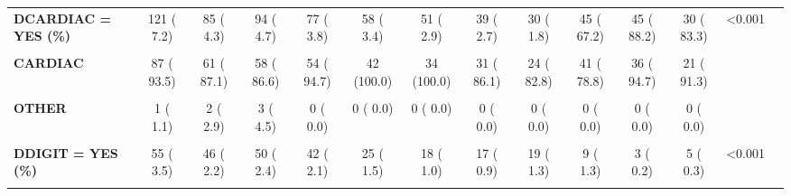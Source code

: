 \documentclass[
]{article}
\begin{document}
\begin{table}[H]
\begin{tabular}[t]{>{\raggedright\arraybackslash}p{5em}ccccccccccccc}
\textbf{DCARDIAC = YES (\%)} & 121 (  7.2) & 85 (  4.3) & 94 (  4.7) & 77 (  3.8) & 58 (  3.4) & 51 (  2.9) & 39 (  2.7) & 30 (  1.8) & 45 ( 67.2) & 45 ( 88.2) & 30 ( 83.3) & <0.001 & \\
\textbf{\cellcolor{gray!10}{DCAUSE (\%)}} & \cellcolor{gray!10}{} & \cellcolor{gray!10}{} & \cellcolor{gray!10}{} & \cellcolor{gray!10}{} & \cellcolor{gray!10}{} & \cellcolor{gray!10}{} & \cellcolor{gray!10}{} & \cellcolor{gray!10}{} & \cellcolor{gray!10}{} & \cellcolor{gray!10}{} & \cellcolor{gray!10}{} & \cellcolor{gray!10}{0.012} & \cellcolor{gray!10}{}\\
\textbf{CARDIAC} & 87 ( 93.5) & 61 ( 87.1) & 58 ( 86.6) & 54 ( 94.7) & 42 (100.0) & 34 (100.0) & 31 ( 86.1) & 24 ( 82.8) & 41 ( 78.8) & 36 ( 94.7) & 21 ( 91.3) &  & \\
\textbf{\cellcolor{gray!10}{NON CARDIAC}} & \cellcolor{gray!10}{5 (  5.4)} & \cellcolor{gray!10}{7 ( 10.0)} & \cellcolor{gray!10}{6 (  9.0)} & \cellcolor{gray!10}{3 (  5.3)} & \cellcolor{gray!10}{0 (  0.0)} & \cellcolor{gray!10}{0 (  0.0)} & \cellcolor{gray!10}{5 ( 13.9)} & \cellcolor{gray!10}{5 ( 17.2)} & \cellcolor{gray!10}{11 ( 21.2)} & \cellcolor{gray!10}{2 (  5.3)} & \cellcolor{gray!10}{2 (  8.7)} & \cellcolor{gray!10}{} & \cellcolor{gray!10}{}\\
\textbf{OTHER} & 1 (  1.1) & 2 (  2.9) & 3 (  4.5) & 0 (  0.0) & 0 (  0.0) & 0 (  0.0) & 0 (  0.0) & 0 (  0.0) & 0 (  0.0) & 0 (  0.0) & 0 (  0.0) &  & \\
\textbf{\cellcolor{gray!10}{DDIABT = YES (\%)}} & \cellcolor{gray!10}{292 ( 18.3)} & \cellcolor{gray!10}{347 ( 16.9)} & \cellcolor{gray!10}{238 ( 11.4)} & \cellcolor{gray!10}{357 ( 17.9)} & \cellcolor{gray!10}{310 ( 17.8)} & \cellcolor{gray!10}{330 ( 18.5)} & \cellcolor{gray!10}{395 ( 21.0)} & \cellcolor{gray!10}{460 ( 25.7)} & \cellcolor{gray!10}{453 ( 25.5)} & \cellcolor{gray!10}{567 ( 78.8)} & \cellcolor{gray!10}{358 ( 48.6)} & \cellcolor{gray!10}{<0.001} & \cellcolor{gray!10}{}\\
\textbf{DDIGIT = YES (\%)} & 55 (  3.5) & 46 (  2.2) & 50 (  2.4) & 42 (  2.1) & 25 (  1.5) & 18 (  1.0) & 17 (  0.9) & 19 (  1.3) & 9 (  1.3) & 3 (  0.2) & 5 (  0.3) & <0.001 & \\
\textbf{\cellcolor{gray!10}{DDIUR = YES (\%)}} & \cellcolor{gray!10}{372 ( 23.2)} & \cellcolor{gray!10}{422 ( 20.6)} & \cellcolor{gray!10}{470 ( 22.4)} & \cellcolor{gray!10}{460 ( 23.0)} & \cellcolor{gray!10}{406 ( 23.8)} & \cellcolor{gray!10}{391 ( 22.5)} & \cellcolor{gray!10}{365 ( 19.4)} & \cellcolor{gray!10}{326 ( 22.4)} & \cellcolor{gray!10}{284 ( 32.9)} & \cellcolor{gray!10}{235 ( 13.7)} & \cellcolor{gray!10}{225 ( 13.0)} & \cellcolor{gray!10}{<0.001} & \cellcolor{gray!10}{}\\

\end{tabular}
\end{table}
\end{document}
